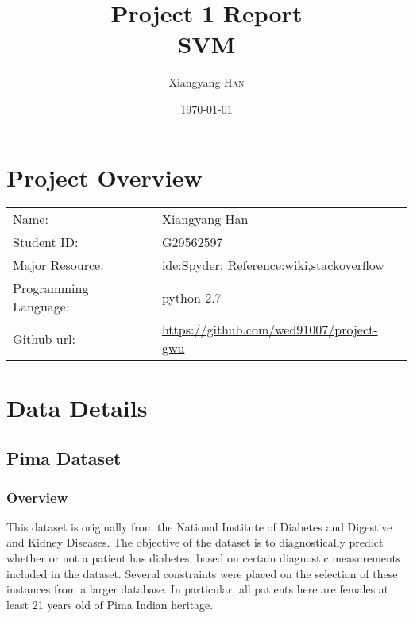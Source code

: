 \documentclass{article}
\title{Project 1 Report \\ SVM} %
\author{Xiangyang \textsc{Han}} %
\date{\today} %
\begin{document}
\maketitle %



\section{Project Overview}


\begin{tabular}{ll}
Name:&Xiangyang Han\\
Student ID:&G29562597\\
Major Resource:&ide:Spyder; Reference:wiki,stackoverflow\\
Programming Language:&python 2.7\\
Github url:&\url{https://github.com/wed91007/project-gwu}
\end{tabular}




 

\section{Data Details}

\subsection{Pima Dataset}
\subsubsection{Overview}
This dataset is originally from the National Institute of Diabetes and Digestive and Kidney Diseases. The objective of the dataset is to diagnostically predict whether or not a patient has diabetes, based on certain diagnostic measurements included in the dataset. Several constraints were placed on the selection of these instances from a larger database. In particular, all patients here are females at least 21 years old of Pima Indian heritage.
\end{document}
